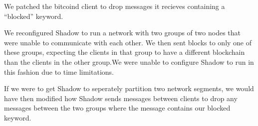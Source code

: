 We patched the bitcoind client to drop messages it recieves containing a ``blocked'' keyword.

We reconfigured Shadow to run a network with two groups of two nodes that were unable to communicate with each other. We then sent blocks to only one of these groups, expecting the clients in that group to have a different blockchain than the clients in the other group.We were unable to configure Shadow to run in this fashion due to time limitations.

If we were to get Shadow to seperately partition two network segments, we would have then modified how Shadow sends messages between clients to drop any messages between the two groups where the message contains our blocked keyword.
